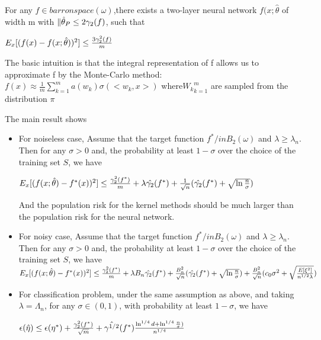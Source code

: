 \documentclass{article}
\begin{document}
For any $f \in barron space(\omega)$,there exists a two-layer neural network $f(x;\hat{\theta}$ of width m with $\|\Hat{\theta}_P\leq 2\gamma_2(f)$, such that
\begin{center}
  $E_x[(f(x)-f(x;\Hat{\theta}))^2]\leq\frac{3\gamma_2^2(f)}{m}$
\end{center}
The basic intuition is that the integral representation of f allows us to approximate f by the Monte-Carlo method:$f(x) \approx\frac{1}{m}\sum_{k=1}^{m} a(w_k){\sigma(<w_k,x>)}$ where${W_k}_{k=1}^m$ are sampled from the distribution $\pi$

The main result shows 
\begin{itemize}
\item For noiseless case, Assume that the target function $f^* /in B_2(\omega)$ and $\lambda \geq \lambda_n$. Then for any $\sigma > 0 $ and, the probability at least $1-\sigma$ over the choice of the training set $S$, we have
    \begin{center}
      $E_x[(f(x;\Hat{\theta})-f^*(x))^2]\leq\frac{\gamma_2^2(f^*)}{m} +\lambda \Hat{\gamma_2}(f^*)+\frac{1}{\sqrt{n}}(\Hat{\gamma_2}(f^*)+\sqrt{\ln{\frac{n}{\sigma}}})$
    \end{center}
And the population risk for the kernel methods should be much larger than the population risk for the neural network.
\item For noisy case, Assume that the target function $f^* /in B_2(\omega)$ and $\lambda \geq \lambda_n$. Then for any $\sigma > 0 $ and, the probability at least $1-\sigma$ over the choice of the training set $S$, we have
      $E_x[(f(x;\Hat{\theta})-f^*(x))^2]\leq\frac{\gamma_2^2(f^*)}{m} +\lambda B_n \Hat{\gamma_2}(f^*)+\frac{B^2_n}{\sqrt{n}}(\Hat{\gamma_2}(f^*)+\sqrt{\ln{\frac{n}{\sigma}}})+\frac{B^2_n}{\sqrt{n}}(c_0 \sigma^2+\sqrt{\frac{E[\xi^2]}{n^{1/2}\lambda}})$
\item For classification problem, under the same assumption as above, and taking $\lambda = \Lambda_n$, for any $\sigma \in (0,1)$, with probability at least $1-\sigma$, we have
    \begin{center}
      $\epsilon(\Hat{\eta}) \leq \epsilon(\eta ^*) + \frac{\gamma_2^2(f^*)}{\sqrt{m}}+\Hat{\gamma^{1/2}}(f^*)\frac{\ln^{1/4}{d}+\ln^{1/4}{\frac{n}{\sigma}})}{n^{1/4}}$
    \end{center}
\end{itemize}
\end{document}
